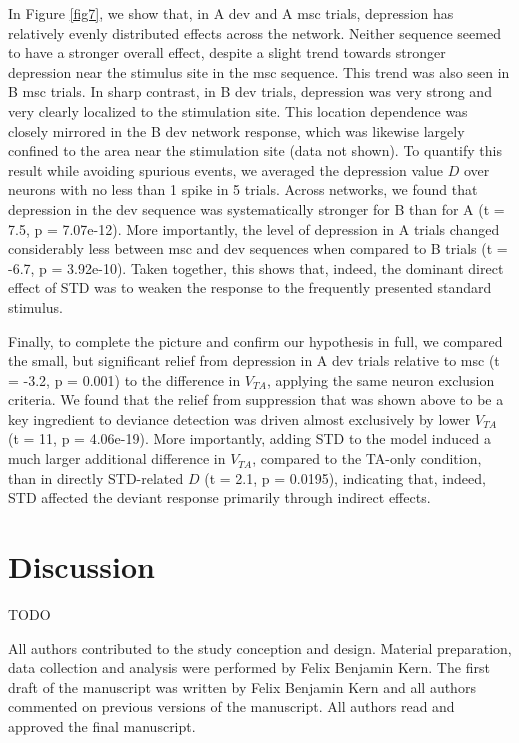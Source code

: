\documentclass[pdflatex,iicol,sn-basic]{sn-jnl}
\theoremstyle{thmstyleone}%
\theoremstyle{thmstyletwo}%
\theoremstyle{thmstylethree}%
\begin{document}
In Figure \ref{fig7}, we show that, in A dev and A msc trials, depression has relatively evenly distributed effects across the network. Neither sequence seemed to have a stronger overall effect, despite a slight trend towards stronger depression near the stimulus site in the msc sequence. This trend was also seen in B msc trials. In sharp contrast, in B dev trials, depression was very strong and very clearly localized to the stimulation site. This location dependence was closely mirrored in the B dev network response, which was likewise largely confined to the area near the stimulation site (data not shown). To quantify this result while avoiding spurious events, we averaged the depression value $D$ over neurons with no less than 1 spike in 5 trials. Across networks, we found that depression in the dev sequence was systematically stronger for B than for A (t = 7.5, p = 7.07e-12). More importantly, the level of depression in A trials changed considerably less between msc and dev sequences when compared to B trials (t = -6.7, p = 3.92e-10). Taken together, this shows that, indeed, the dominant direct effect of STD was to weaken the response to the frequently presented standard stimulus.

Finally, to complete the picture and confirm our hypothesis in full, we compared the small, but significant relief from depression in A dev trials relative to msc (t = -3.2, p = 0.001) to the difference in $V_{TA}$, applying the same neuron exclusion criteria. We found that the relief from suppression that was shown above to be a key ingredient to deviance detection was driven almost exclusively by lower $V_{TA}$ (t = 11, p = 4.06e-19). More importantly, adding STD to the model induced a much larger additional difference in $V_{TA}$, compared to the TA-only condition, than in directly STD-related $D$ (t = 2.1, p = 0.0195), indicating that, indeed, STD affected the deviant response primarily through indirect effects.

\section{Discussion}\label{sec-discussion}

\backmatter

TODO

All authors contributed to the study conception and design. Material preparation, data collection and analysis were performed by Felix Benjamin Kern. The first draft of the manuscript was written by Felix Benjamin Kern and all authors commented on previous versions of the manuscript. All authors read and approved the final manuscript.
\end{document}
